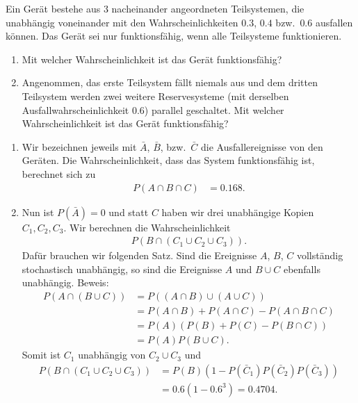 Ein Gerät bestehe aus $3$ nacheinander angeordneten Teilsystemen, die
unabhängig voneinander mit den Wahrscheinlichkeiten $0.3$, $0.4$ bzw.~$0.6$
ausfallen können. Das Gerät sei nur funktionsfähig, wenn alle Teilsysteme
funktionieren.
\begin{enumerate}
\item Mit welcher Wahrscheinlichkeit ist das Gerät funktionsfähig?

\item Angenommen, das erste Teilsystem fällt niemals aus und dem dritten
    Teilsystem werden zwei weitere Reservesysteme (mit derselben
    Ausfallwahrscheinlichkeit $0.6$) parallel geschaltet. Mit welcher
    Wahrscheinlichkeit ist das Gerät funktionsfähig?
\end{enumerate}

\solution 
\begin{enumerate}
    \item Wir bezeichnen jeweils mit $\bar A$, $\bar B$, bzw.\ $\bar C$ die Ausfallereignisse
        von den Geräten. Die Wahrscheinlichkeit, dass das System funktionsfähig ist, berechnet 
        sich zu
        \begin{align*}
            P( A \cap B \cap C ) &= 0.168.
        \end{align*}

    \item Nun ist $P(\bar A) = 0$ und statt $C$ haben wir drei unabhängige Kopien $C_1,C_2,C_3$.
        Wir berechnen die Wahrscheinlichkeit
        \begin{align*}
            P( B \cap (C_1 \cup C_2 \cup C_3)  ).
        \end{align*}
        Dafür brauchen wir folgenden Satz. Sind die Ereignisse $A$, $B$, $C$ vollständig stochastisch
        unabhängig, so sind die Ereignisse $A$ und $B\cup C$ ebenfalls unabhängig. Beweis:
        \begin{align*}
            P(A \cap ( B \cup C)) &= P( (A\cap B) \cup (A\cup C) ) \\
            &= P( A\cap B ) + P(A\cap C) - P(A \cap B\cap C) \\
            &= P(A) \left(   P(B) + P(C) - P(B\cap C)   \right) \\
            &= P(A) P(B\cup C). 
        \end{align*}
        Somit ist $C_1$ unabhängig von $C_2 \cup C_3$ und 
        \begin{align*}
            P\left( B \cap ( C_1 \cup C_2 \cup C_3 ) \right) &= P(B)( 1 - P(\bar C_1)P(\bar C_2)P(\bar C_3)   ) \\
            &= 0.6\left( 1- {0.6}^{3} \right) = 0.4704. 
        \end{align*}
\end{enumerate}


